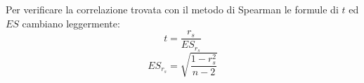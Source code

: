 \documentclass[10pt, draft]{book}
\begin{document}
Per verificare la correlazione trovata con il metodo di Spearman le formule di $t$ ed $ES$ cambiano leggermente:
\begin{equation}
    t = \frac{r_s}{ES_{r_s}}
\end{equation}
\begin{equation}
    ES_{r_s} = \sqrt{\frac{1-r_s^2}{n-2}}
\end{equation}
\end{document}
